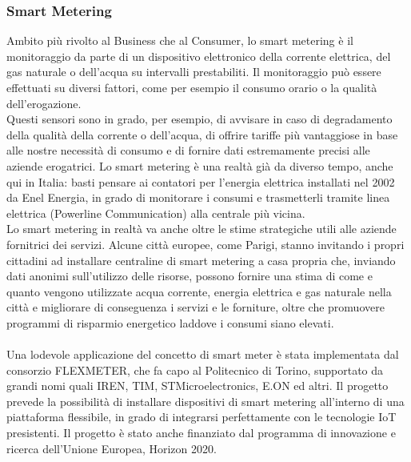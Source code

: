\subsubsection{Smart Metering}
Ambito più rivolto al Business che al Consumer, lo smart metering è il monitoraggio da parte di un dispositivo elettronico della corrente elettrica, del gas naturale o dell'acqua su intervalli prestabiliti. Il monitoraggio può essere effettuati su diversi fattori, come per esempio il consumo orario o la qualità dell'erogazione.
\\Questi sensori sono in grado, per esempio, di avvisare in caso di degradamento della qualità della corrente o dell'acqua, di offrire tariffe più vantaggiose in base alle nostre necessità di consumo e di fornire dati estremamente precisi alle aziende erogatrici. Lo smart metering è una realtà già da diverso tempo, anche qui in Italia: basti pensare ai contatori per l'energia elettrica installati nel 2002 da Enel Energia, in grado di monitorare i consumi e trasmetterli tramite linea elettrica (Powerline Communication) alla centrale più vicina.
\\Lo smart metering in realtà va anche oltre le stime strategiche utili alle aziende fornitrici dei servizi. Alcune città europee, come Parigi, stanno invitando i propri cittadini ad installare centraline di smart metering a casa propria che, inviando dati anonimi sull'utilizzo delle risorse, possono fornire una stima di come e quanto vengono utilizzate acqua corrente, energia elettrica e gas naturale nella città e migliorare di conseguenza i servizi e le forniture, oltre che promuovere programmi di risparmio energetico laddove i consumi siano elevati.
\\\\Una lodevole applicazione del concetto di smart meter è stata implementata dal consorzio FLEXMETER, che fa capo al Politecnico di Torino, supportato da grandi nomi quali IREN, TIM, STMicroelectronics, E.ON ed altri. Il progetto prevede la possibilità di installare dispositivi di smart metering all'interno di una piattaforma flessibile, in grado di integrarsi perfettamente con le tecnologie IoT presistenti. Il progetto è stato anche  finanziato dal programma di innovazione e ricerca dell'Unione Europea, Horizon 2020.
